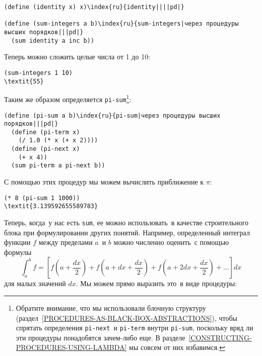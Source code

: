 \begin{Verbatim}[fontsize=\small]
(define (identity x) x)\index{ru}{identity||||pd|}

(define (sum-integers a b)\index{ru}{sum-integers|через процедуры высших порядков|||pd|}
  (sum identity a inc b))
\end{Verbatim}
Теперь можно сложить целые числа от 1 до 10:

\begin{Verbatim}[fontsize=\small]
(sum-integers 1 10)
\textit{55}
\end{Verbatim}
Таким же образом определяется {\tt pi-sum}\footnote{Обратите внимание, что мы использовали блочную структуру
(раздел~\ref{PROCEDURES-AS-BLACK-BOX-ABSTRACTIONS}),
чтобы спрятать определения {\tt pi-next}~и {\tt pi-term} 
внутри {\tt pi-sum}, поскольку вряд ли эти процедуры
понадобятся зачем-либо еще. В разделе~\ref{CONSTRUCTING-PROCEDURES-USING-LAMBDA} мы совсем от них избавимся.}:

\begin{Verbatim}[fontsize=\small]
(define (pi-sum a b)\index{ru}{pi-sum|через процедуры высших порядков|||pd|}
  (define (pi-term x)
    (/ 1.0 (* x (+ x 2))))
  (define (pi-next x)
    (+ x 4))
  (sum pi-term a pi-next b))
\end{Verbatim}
С помощью этих процедур мы можем вычислить приближение к
$\pi$:

\begin{Verbatim}[fontsize=\small]
(* 8 (pi-sum 1 1000))
\textit{3.139592655589783}
\end{Verbatim}

Теперь, когда~у нас есть {\tt sum}, ее можно
использовать~в качестве строительного блока при формулировании
других понятий.  Например,  
определенный интеграл функции 
$f$ между пределами $a$~и $b$ можно
численно оценить~с помощью формулы
$$
\int_a^b f = \left\lbrack
   f\left(a+\dfrac{dx}{2}\right) 
   + f\left(a + dx + \dfrac{dx}{2}\right)
   + f\left(a + 2dx + \dfrac{dx}{2}\right)
   + \ldots
  \right\rbrack dx
$$
для малых значений $dx$.  Мы можем прямо выразить это~в виде 
процедуры:

